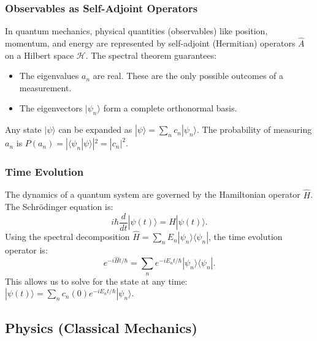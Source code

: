 \subsubsection{Observables as Self-Adjoint Operators}
In quantum mechanics, physical quantities (observables) like position, momentum, and energy are represented by self-adjoint (Hermitian) operators $\hat{A}$ on a Hilbert space $\mathcal{H}$.
The spectral theorem guarantees:
\begin{itemize}
  \item The eigenvalues $a_n$ are real. These are the only possible outcomes of a measurement.
  \item The eigenvectors $|\psi_n\rangle$ form a complete orthonormal basis.
\end{itemize}
Any state $|\psi\rangle$ can be expanded as $|\psi\rangle = \sum_n c_n |\psi_n\rangle$. The probability of measuring $a_n$ is $P(a_n) = |\langle \psi_n | \psi \rangle|^2 = |c_n|^2$.

\subsubsection{Time Evolution}
The dynamics of a quantum system are governed by the Hamiltonian operator $\hat{H}$. The Schrödinger equation is:
\[
  i\hbar \frac{d}{dt}|\psi(t)\rangle = \hat{H}|\psi(t)\rangle.
\]
Using the spectral decomposition $\hat{H} = \sum_n E_n |\psi_n\rangle\langle\psi_n|$, the time evolution operator is:
\[
  e^{-i\hat{H}t/\hbar} = \sum_n e^{-iE_n t/\hbar} |\psi_n\rangle\langle\psi_n|.
\]
This allows us to solve for the state at any time: $|\psi(t)\rangle = \sum_n c_n(0) e^{-iE_n t/\hbar} |\psi_n\rangle$.

\begin{center}
\end{center}

\subsection{Physics (Classical Mechanics)}

